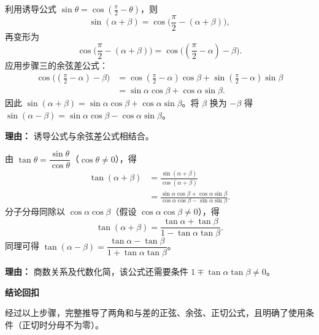 \begin{proofbox}
\begin{description}[style=nextline, leftmargin=2.8em, labelsep=0.5em, itemsep=0.55em]
		\item[\textbf{步骤五（正弦和公式）：}] 利用诱导公式 $\sin\theta=\cos(\frac{\pi}{2}-\theta)$，则
			\[
				\sin(\alpha+\beta)=\cos\!\Big(\frac{\pi}{2}-(\alpha+\beta)\Big),
			\]
			再变形为
			\[
				\cos\!\Big(\frac{\pi}{2}-(\alpha+\beta)\Big)=\cos\!\Big((\frac{\pi}{2}-\alpha)-\beta\Big).
			\]
			应用步骤三的余弦差公式：
			\[
				\begin{aligned}
					\cos\!\Big((\frac{\pi}{2}-\alpha)-\beta\Big) &= \cos(\frac{\pi}{2}-\alpha)\cos\beta+\sin(\frac{\pi}{2}-\alpha)\sin\beta \\
					&= \sin\alpha\cos\beta+\cos\alpha\sin\beta.
			\end{aligned}
			\]
			因此 $\sin(\alpha+\beta)=\sin\alpha\cos\beta+\cos\alpha\sin\beta$。将 $\beta$ 换为 $-\beta$ 得 $\sin(\alpha-\beta)=\sin\alpha\cos\beta-\cos\alpha\sin\beta$。
			\par\textbf{理由：} 诱导公式与余弦差公式相结合。

		\item[\textbf{步骤六（正切和公式）：}] 由 $\tan\theta=\dfrac{\sin\theta}{\cos\theta}$（$\cos\theta\neq0$），得
			\[
				\begin{aligned}
					\tan(\alpha+\beta) &= \frac{\sin(\alpha+\beta)}{\cos(\alpha+\beta)} \\
					&= \frac{\sin\alpha\cos\beta+\cos\alpha\sin\beta}{\cos\alpha\cos\beta-\sin\alpha\sin\beta}.
			\end{aligned}
			\]
			分子分母同除以 $\cos\alpha\cos\beta$（假设 $\cos\alpha\cos\beta\neq0$），得
			\[
				\tan(\alpha+\beta)=\frac{\tan\alpha+\tan\beta}{1-\tan\alpha\tan\beta}.
			\]
			同理可得 $\tan(\alpha-\beta)=\dfrac{\tan\alpha-\tan\beta}{1+\tan\alpha\tan\beta}$。
			\par\textbf{理由：} 商数关系及代数化简，该公式还需要条件 $1\mp\tan\alpha\tan\beta\neq0$。
	\end{description}

	\medskip
	\textbf{\textcolor{CProof}{结论回扣}}

	经过以上步骤，完整推导了两角和与差的正弦、余弦、正切公式，且明确了使用条件（正切时分母不为零）。
\end{proofbox}
